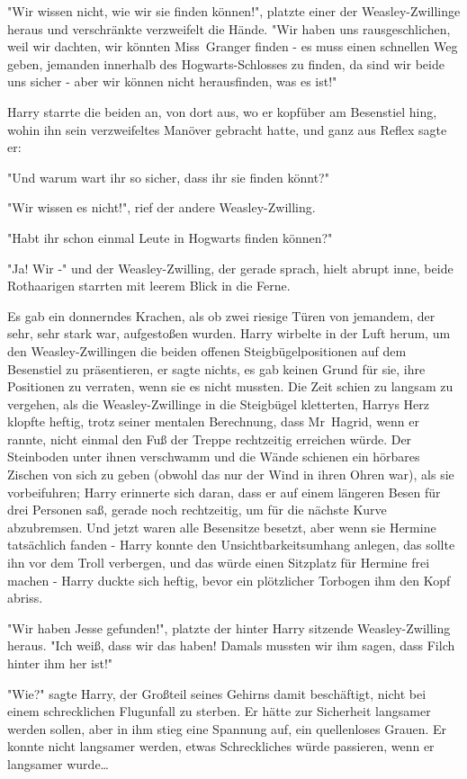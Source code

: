 {"Wir wissen nicht, wie wir sie finden können!", platzte einer der Weasley-Zwillinge heraus und verschränkte verzweifelt die Hände. "Wir haben uns rausgeschlichen, weil wir dachten, wir könnten Miss~Granger finden - es muss einen schnellen Weg geben, jemanden innerhalb des Hogwarts-Schlosses zu finden, da sind wir beide uns sicher - aber wir können nicht herausfinden, was es ist!"

Harry starrte die beiden an, von dort aus, wo er kopfüber am Besenstiel hing, wohin ihn sein verzweifeltes Manöver gebracht hatte, und ganz aus Reflex sagte er:

"Und warum wart ihr so sicher, dass ihr sie finden könnt?"

"Wir wissen es nicht!", rief der andere Weasley-Zwilling.

"Habt ihr schon einmal Leute in Hogwarts finden können?"

"Ja! Wir -" und der Weasley-Zwilling, der gerade sprach, hielt abrupt inne, beide Rothaarigen starrten mit leerem Blick in die Ferne.

Es gab ein donnerndes Krachen, als ob zwei riesige Türen von jemandem, der sehr, sehr stark war, aufgestoßen wurden. Harry wirbelte in der Luft herum, um den Weasley-Zwillingen die beiden offenen Steigbügelpositionen auf dem Besenstiel zu präsentieren, er sagte nichts, es gab keinen Grund für sie, ihre Positionen zu verraten, wenn sie es nicht mussten. Die Zeit schien zu langsam zu vergehen, als die Weasley-Zwillinge in die Steigbügel kletterten, Harrys Herz klopfte heftig, trotz seiner mentalen Berechnung, dass Mr~Hagrid, wenn er rannte, nicht einmal den Fuß der Treppe rechtzeitig erreichen würde. Der Steinboden unter ihnen verschwamm und die Wände schienen ein hörbares Zischen von sich zu geben (obwohl das nur der Wind in ihren Ohren war), als sie vorbeifuhren; Harry erinnerte sich daran, dass er auf einem längeren Besen für drei Personen saß, gerade noch rechtzeitig, um für die nächste Kurve abzubremsen. Und jetzt waren alle Besensitze besetzt, aber wenn sie Hermine tatsächlich fanden - Harry konnte den Unsichtbarkeitsumhang anlegen, das sollte ihn vor dem Troll verbergen, und das würde einen Sitzplatz für Hermine frei machen - Harry duckte sich heftig, bevor ein plötzlicher Torbogen ihm den Kopf abriss.

"Wir haben Jesse gefunden!", platzte der hinter Harry sitzende Weasley-Zwilling heraus. "Ich weiß, dass wir das haben! Damals mussten wir ihm sagen, dass Filch hinter ihm her ist!"

"Wie?" sagte Harry, der Großteil seines Gehirns damit beschäftigt, nicht bei einem schrecklichen Flugunfall zu sterben. Er hätte zur Sicherheit langsamer werden sollen, aber in ihm stieg eine Spannung auf, ein quellenloses Grauen. Er konnte nicht langsamer werden, etwas Schreckliches würde passieren, wenn er langsamer wurde…

}

